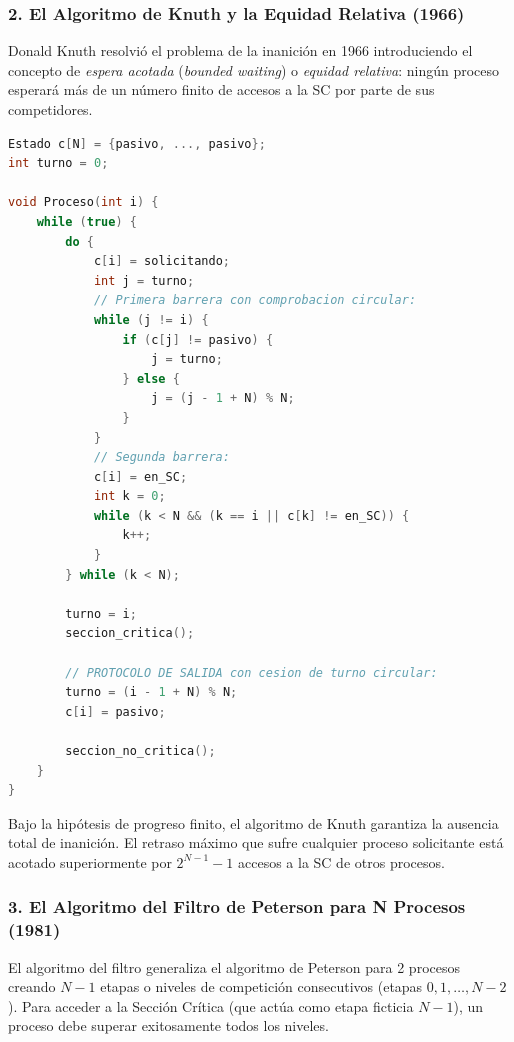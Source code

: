 \subsubsection{2. El Algoritmo de Knuth y la Equidad Relativa (1966)}
Donald Knuth resolvió el problema de la inanición en 1966 introduciendo el concepto de \textit{espera acotada} (\textit{bounded waiting}) o \textit{equidad relativa}: ningún proceso esperará más de un número finito de accesos a la SC por parte de sus competidores.

\begin{algoritmo}
\begin{lstlisting}[language=C++]
Estado c[N] = {pasivo, ..., pasivo};
int turno = 0;

void Proceso(int i) {
    while (true) {
        do {
            c[i] = solicitando;
            int j = turno;
            // Primera barrera con comprobacion circular:
            while (j != i) {
                if (c[j] != pasivo) {
                    j = turno;
                } else {
                    j = (j - 1 + N) % N;
                }
            }
            // Segunda barrera:
            c[i] = en_SC;
            int k = 0;
            while (k < N && (k == i || c[k] != en_SC)) {
                k++;
            }
        } while (k < N);
        
        turno = i;
        seccion_critica();
        
        // PROTOCOLO DE SALIDA con cesion de turno circular:
        turno = (i - 1 + N) % N;
        c[i] = pasivo;
        
        seccion_no_critica();
    }
}
\end{lstlisting}
\end{algoritmo}

\begin{teorema}
Bajo la hipótesis de progreso finito, el algoritmo de Knuth garantiza la ausencia total de inanición. El retraso máximo que sufre cualquier proceso solicitante está acotado superiormente por $2^{N-1} - 1$ accesos a la SC de otros procesos.
\end{teorema}

\subsubsection{3. El Algoritmo del Filtro de Peterson para N Procesos (1981)}
El algoritmo del filtro generaliza el algoritmo de Peterson para 2 procesos creando $N-1$ etapas o niveles de competición consecutivos (etapas $0, 1, \dots, N-2$). Para acceder a la Sección Crítica (que actúa como etapa ficticia $N-1$), un proceso debe superar exitosamente todos los niveles.

